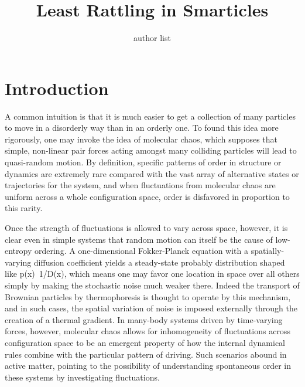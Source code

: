 \documentclass[reprint,prx]{revtex4-1}
\renewcommand{\=}[1]{\stackrel{#1}{=}} %
\renewcommand{\(}{\left (}
\renewcommand{\)}{\right  )}
\renewcommand{\[}{\left [}
\renewcommand{\]}{\right ]}
\newcommand{\<}{\left <}
\renewcommand{\>}{\right >}
\theoremstyle{definition}
\theoremstyle{remark}
\begin{document}
		\title{Least Rattling in Smarticles}
		
		\author{author list} %
		
		\maketitle


\tableofcontents


\section{Introduction}
A common intuition is that it is much easier to get a collection of many particles to move in a disorderly way than in an orderly one. To found this idea more rigorously, one may invoke the idea of molecular chaos, which supposes that simple, non-linear pair forces acting amongst many colliding particles will lead to quasi-random motion. By definition, specific patterns of order in structure or dynamics are extremely rare compared with the vast array of alternative states or trajectories for the system, and when fluctuations from molecular chaos are uniform across a whole configuration space, order is disfavored in proportion to this rarity.  

Once the strength of fluctuations is allowed to vary across space, however, it is clear even in simple systems that random motion can itself be the cause of low-entropy ordering.  A one-dimensional Fokker-Planck equation with a spatially-varying diffusion coefficient yields a steady-state probably distribution shaped like p(x)~1/D(x), which means one may favor one location in space over all others simply by making the stochastic noise much weaker there.  Indeed the transport of Brownian particles by thermophoresis is thought to operate by this mechanism, and in such cases, the spatial variation of noise is imposed externally through the creation of a thermal gradient. In many-body systems driven by time-varying forces, however, molecular chaos allows for inhomogeneity of fluctuations across configuration space to be an emergent property of how the internal dynamical rules combine with the particular pattern of driving.  Such scenarios abound in active matter, pointing to the possibility of understanding spontaneous order in these systems by investigating fluctuations.
\end{document}
